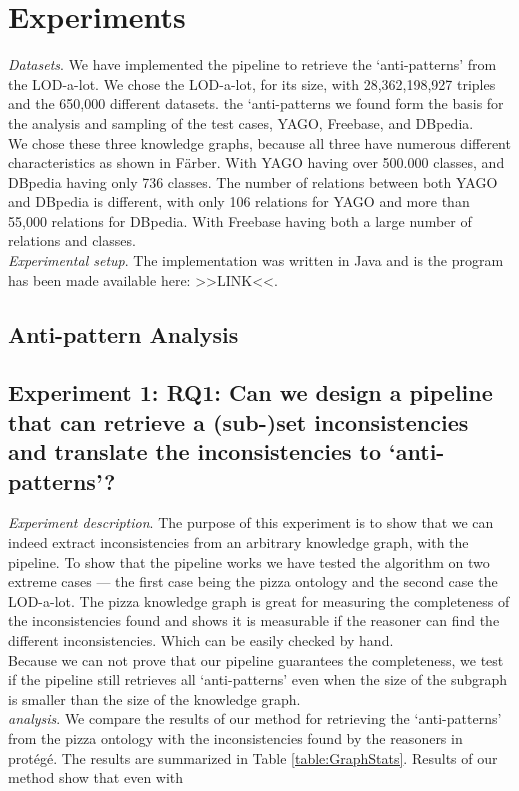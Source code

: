 \documentclass{article}
\begin{document}
\newpage
\section{Experiments}
\textit{Datasets}. We have implemented the pipeline to retrieve the `anti-patterns' from the LOD-a-lot. We chose the LOD-a-lot, for its size, with 28,362,198,927 triples and the 650,000 different datasets. the `anti-patterns we found form the basis for the analysis and sampling of the test cases, YAGO, Freebase, and DBpedia.\\
We chose these three knowledge graphs, because all three have numerous different characteristics as shown in F\"arber\cite{MichaelF:2017}. With YAGO having over 500.000 classes, and DBpedia having only 736 classes. The number of relations between both YAGO and DBpedia is different, with only 106 relations for YAGO and more than 55,000 relations for DBpedia. With Freebase having both a large number of relations and classes.\\

\textit{Experimental setup}. The implementation was written in Java and is the program has been made available here: >>LINK<<.   %

\subsection{Anti-pattern Analysis}

\subsection{Experiment 1: \textbf{RQ1}:  Can we design a pipeline that can retrieve a (sub-)set inconsistencies and translate the inconsistencies to `anti-patterns'?}
\textit{Experiment description}. The purpose of this experiment is to show that we can indeed extract inconsistencies from an arbitrary knowledge graph, with the pipeline. 
To show that the pipeline works we have tested the algorithm on two extreme cases — the first case being the pizza ontology and the second case the LOD-a-lot.
The pizza knowledge graph is great for measuring the completeness of the inconsistencies found and shows it is measurable if the reasoner can find the different inconsistencies. Which can be easily checked by hand.\\
Because we can not prove that our pipeline guarantees the completeness, we test if the pipeline still retrieves all `anti-patterns' even when the size of the subgraph is 
smaller than the size of the knowledge graph.\\
\textit{analysis}. We compare the results of our method for retrieving the `anti-patterns' from the pizza ontology with the inconsistencies found by the reasoners in prot\'{e}g\'{e}.
The results are summarized in Table \ref{table:GraphStats}. Results of our method show that even with 
\end{document}

